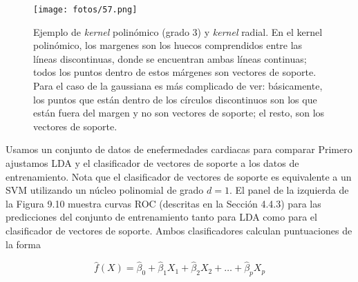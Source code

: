\begin{figure}[h]
\centering
\texttt{[image: fotos/57.png]}
\caption{Ejemplo de \textit{kernel} polinómico (grado 3) y \textit{kernel} radial. En el kernel polinómico, los margenes son los huecos comprendidos entre las líneas discontinuas, donde se encuentran ambas líneas continuas; todos los puntos dentro de estos márgenes son vectores de soporte. Para el caso de la gaussiana es más complicado de ver: básicamente, los puntos que están dentro de los círculos discontinuos son los que están fuera del margen y no son vectores de soporte; el resto, son los vectores de soporte.}
\label{fig:12.2}
\end{figure}

\begin{example}
Usamos un conjunto de datos de enefermedades cardiacas para comparar 
Primero ajustamos LDA y el clasificador de vectores de soporte a los datos de entrenamiento.
Nota que el clasificador de vectores de soporte es equivalente a un SVM utilizando un núcleo polinomial de grado $d = 1$.
El panel de la izquierda de la Figura 9.10 muestra curvas ROC (descritas en la Sección 4.4.3) para las predicciones del conjunto de entrenamiento tanto para LDA como para el clasificador de vectores de soporte.
Ambos clasificadores calculan puntuaciones de la forma

\begin{equation}
\hat{f}(X) = \hat{\beta}_0 + \hat{\beta}_1 X_1 + \hat{\beta}_2 X_2 + \dots + \hat{\beta}_p X_p
\end{equation}


\end{example}
